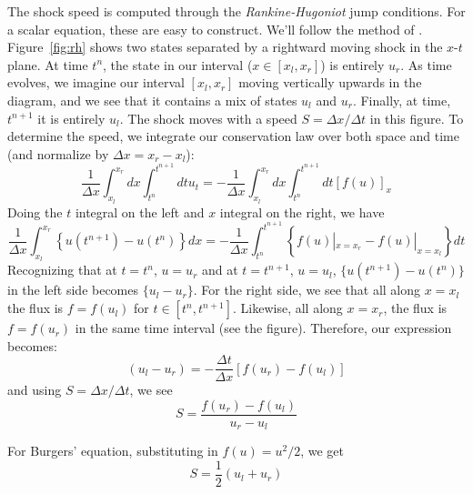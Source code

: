 The shock speed is computed through the {\em Rankine-Hugoniot} jump
conditions.  For a scalar equation, these are easy to construct.
We'll follow the method of \cite{leveque:2002}.  Figure~\ref{fig:rh}
shows two states separated by a rightward moving shock in the $x$-$t$
plane.  At time $t^n$, the state in our interval ($x \in [x_l,x_r]$)
is entirely $u_r$.  As time evolves, we imagine our interval $[x_l,x_r]$ moving
vertically upwards in the diagram, and we see that it contains a mix of states $u_l$ and $u_r$.  Finally, at time, $t^{n+1}$ it is entirely
$u_l$.  The shock moves with a speed $S = \Delta x/\Delta t$ in this
figure.  To determine the speed, we integrate our conservation law over
both space and time (and normalize by $\Delta x = x_r - x_l$):
\begin{equation}
\frac{1}{\Delta x} \int_{x_l}^{x_r} dx \int_{t^n}^{t^{n+1}} dt u_t = 
  - \frac{1}{\Delta x} \int_{x_l}^{x_r} dx \int_{t^n}^{t^{n+1}} dt \left [ f(u) \right ]_x
\end{equation}
Doing the $t$ integral on the left and $x$ integral on the right, we have
\begin{equation}
\frac{1}{\Delta x} \int_{x_l}^{x_r}\left \{ u(t^{n+1}) - u(t^n) \right \} dx = 
  - \frac{1}{\Delta x} \int_{t^n}^{t^{n+1}} \left \{ f(u) |_{x=x_r} - f(u) |_{x=x_l} \right \} dt
\end{equation}
Recognizing that at $t=t^n$, $u = u_r$ and at $t=t^{n+1}$, $u = u_l$,
$\{ u(t^{n+1}) - u(t^n) \}$ in the left side becomes $\{ u_l -u_r \}$.
For the right side, we see that all along $x=x_l$ the flux is $f =
f(u_l)$ for $t\in [t^n, t^{n+1}]$.  Likewise, all along $x=x_r$, the
flux is $f = f(u_r)$ in the same time interval (see the figure).
Therefore, our expression becomes:
\begin{equation}
(u_l - u_r) = -\frac{\Delta t}{\Delta x} \left [ f(u_r) - f(u_l)\right ]
\end{equation}
and using $S = \Delta x/\Delta t$, we see
\begin{equation}
S = \frac{f(u_r) - f(u_l)}{u_r - u_l}
\end{equation}

For Burgers' equation, substituting in $f(u) = u^2/2$, we get
\begin{equation}
S = \frac{1}{2}(u_l + u_r)
\end{equation}


